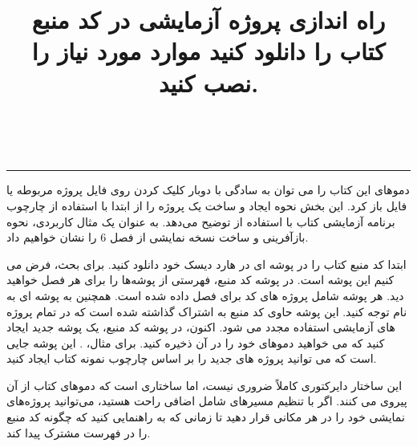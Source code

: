     \title{
        \LARGE
        \textbf{راه اندازی پروژه آزمایشی در }
    }
    \\ \rule{\textwidth}{0.5pt}
    {\large
    دموهای این کتاب را می توان به سادگی با دوبار کلیک کردن روی فایل پروژه مربوطه  یا فایل  باز کرد.
    این بخش نحوه ایجاد و ساخت یک پروژه را از ابتدا با استفاده از چارچوب برنامه آزمایشی کتاب با استفاده از  توضیح می‌دهد.
    به عنوان یک مثال کاربردی، نحوه بازآفرینی و ساخت نسخه نمایشی  از فصل 6 را نشان خواهیم داد.
    } %

    \title{
        \Large
        \textbf{کد منبع کتاب را دانلود کنید}
    }

    {\large
    ابتدا کد منبع کتاب را در پوشه ای در هارد دیسک خود دانلود کنید.
    برای بحث، فرض می کنیم این پوشه  است.
    در پوشه کد منبع، فهرستی از پوشه‌ها را برای هر فصل خواهید دید. هر پوشه شامل پروژه های کد برای فصل داده شده است.
    همچنین به پوشه ای به نام  توجه کنید. این پوشه حاوی کد منبع به اشتراک گذاشته شده است که در تمام پروژه های آزمایشی استفاده مجدد می شود.
    اکنون، در پوشه کد منبع، یک پوشه جدید ایجاد کنید که می خواهید دموهای خود را در آن ذخیره کنید. برای مثال، . این پوشه جایی است که می توانید پروژه های جدید را بر اساس چارچوب نمونه کتاب ایجاد کنید.

    این ساختار دایرکتوری کاملاً ضروری نیست، اما ساختاری است که دموهای کتاب از آن پیروی می کنند. اگر با تنظیم مسیرهای شامل اضافی راحت هستید، می‌توانید پروژه‌های نمایشی خود را در هر مکانی قرار دهید تا زمانی که به  راهنمایی کنید که چگونه کد منبع را در فهرست مشترک پیدا کند.
    } %

    \title{
        \Large
        \textbf{موارد مورد نیاز  را نصب کنید.}
    }

